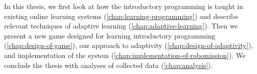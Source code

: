 

In this thesis, we first look at how the introductory programming is taught
in existing online learning systems
(\cref{chap:learning-programming})
and describe relevant techniques of adaptive learning
(\cref{chap:adaptive-learning}).
Then we present a new game designed for learning introductory programming
(\cref{chap:design-of-game}),
our approach to adaptivity (\cref{chap:design-of-adaptivity}),
and implementation of the system (\cref{chap:implementation-of-robomission}).
We conclude the thesis with analyses of collected data
(\cref{chap:analysis}).
